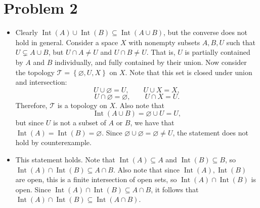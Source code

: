 \documentclass[11pt, letterpaper]{article}
\DeclareMathOperator{\Int}{Int}
\begin{document}
\section*{Problem 2}
\begin{itemize}
	\item Clearly $\Int(A) \cup \Int(B) \subseteq \Int(A\cup B) $, but the converse does not hold in general. Consider a space $X$ with nonempty subsets $A,B,U$ such that $U\subsetneq A\cup B$, but $U \cap A \neq U$ and $U \cap B\neq U$. That is, $U$ is partially contained by $A$ and $B$ individually, and fully contained by their union. Now consider the topology $\mathcal{T} =\left\{ \varnothing ,U,X \right\} $ on $X$. Note that this set is closed under union and intersection:
		\[
			U \cup \varnothing =U ,\qquad U \cup X = X,
		\]
		\[
			U \cap \varnothing =\varnothing ,\qquad U \cap X = U
		.\]
		Therefore, $\mathcal{T} $ is a topology on $X$. Also note that
		\[
			\Int(A\cup B) =\varnothing \cup U = U
		,\]
		but since $U$ is not a subset of $A$ or $B$, we have that $\Int(A) =\Int(B) =\varnothing $. Since $\varnothing \cup \varnothing =\varnothing \neq U$, the statement does not hold by counterexample.
	\item This statement holds. Note that $\Int(A) \subseteq A$ and $\Int(B) \subseteq B$, so $\Int(A) \cap \Int(B) \subseteq A \cap B$. Also note that since $\Int(A) ,\Int(B) $ are open, this is a finite intersection of open sets, so $\Int(A) \cap \Int(B) $ is open. Since $\Int(A) \cap \Int(B) \subseteq A \cap B$, it follows that $\Int(A) \cap  \Int(B) \subseteq \Int(A \cap B) $.


\end{itemize}
\end{document}
